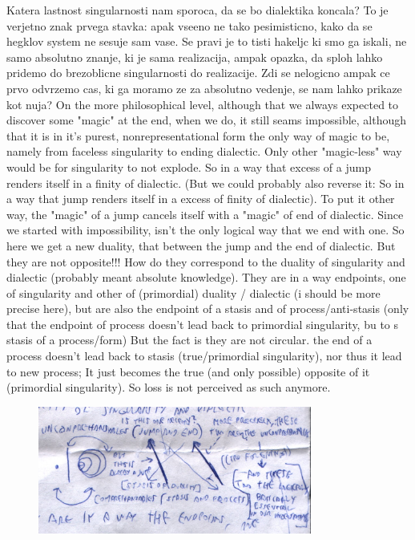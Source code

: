 \documentclass{book}
\begin{document}
Katera lastnost singularnosti nam sporoca, da se bo dialektika koncala? 
To je verjetno znak prvega stavka: apak vseeno ne tako pesimisticno, kako da se hegklov system ne sesuje sam vase. Se pravi je to tisti hakeljc ki smo ga iskali, ne samo absolutno znanje, ki je sama realizacija, ampak opazka, da sploh lahko pridemo do brezoblicne singularnosti do realizacije. Zdi se nelogicno ampak ce prvo odvrzemo cas, ki ga moramo ze za absolutno vedenje, se nam lahko prikaze kot nuja? On the more philosophical level, although that we always expected to discover some "magic" at the end, when we do, it still seams impossible, although that it is in it's purest, nonrepresentational form the only way of magic to be, namely from faceless singularity to ending dialectic. Only other "magic-less" way would be for singularity to not explode. So in a way that excess of a jump renders itself in a finity of dialectic. (But we could probably also reverse it: So in a way that jump renders itself in a excess of finity of dialectic). To put it other way, the "magic" of a jump cancels itself with a "magic" of end of dialectic. Since we started with impossibility, isn't the only logical way that we end with one. 
So here we get a new duality, that between the jump and the end of dialectic. But they are not opposite!!! How do they correspond to the duality of singularity and dialectic (probably meant absolute knowledge). They are in a way endpoints, one of singularity and other of (primordial) duality / dialectic (i should be more precise here), but are also the endpoint of a stasis and of process/anti-stasis (only that the endpoint of process doesn't lead back to primordial singularity, bu to s stasis of a process/form) But the fact is they are not circular. the end of a process doesn't lead back to stasis (true/primordial singularity), nor thus it lead to new process; It just becomes the true (and only possible) opposite of it (primordial singularity). So loss is not perceived as such anymore. 

\begin{figure}[ht!]
\centering
\includegraphics[width=90mm]{scan02.jpg}
\label{overflow}
\end{figure}
\end{document}
